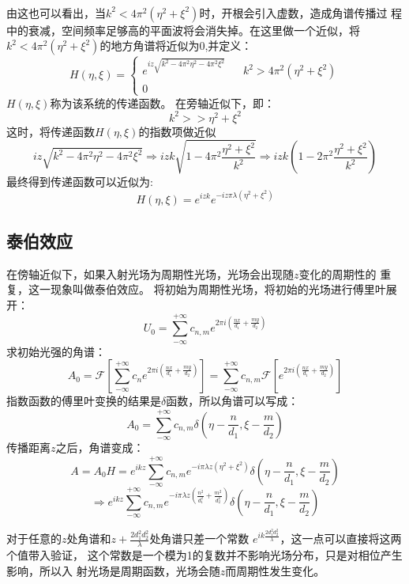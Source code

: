\documentclass{article}
\begin{document}
\paragraph{}
由这也可以看出，当$k^2<4\pi^{2}(\eta^2+\xi^2)$时，开根会引入虚数，造成角谱传播过
程中的衰减，空间频率足够高的平面波将会消失掉。在这里做一个近似，将
$k^2<4\pi^2(\eta^2+\xi^2)$的地方角谱将近似为0,并定义：
\begin{equation}
  \label{eq:4}
  H(\eta,\xi)=\left \{
    \begin{array}{rcl}
      e^{iz \sqrt{k^2-4\pi^2\eta^2-4\pi^2\xi^2}}&&{k^2>4\pi^2(\eta^2+\xi^2)}\\
      0&&{}
    \end{array}
  \right
  .
\end{equation}
$H(\eta,\xi)$称为该系统的传递函数。
在旁轴近似下，即：
\[k^2>>\eta^2+\xi^2\]这时，将传递函数$H(\eta,\xi)$的指数项做近似
\[iz \sqrt{k^2-4\pi^2\eta^2-4\pi^2\xi^2}\Rightarrow izk
  \sqrt{1-4\pi^2\frac{\eta^2+\xi^2}{k^{2}}}\Rightarrow
  izk(1-2\pi^2\frac{\eta^2+\xi^2}{k^{2}})\]
最终得到传递函数可以近似为:
\begin{equation}
  \label{eq:5}
  H(\eta,\xi)=e^{izk}e^{-iz\pi\lambda(\eta^2+\xi^2)}
\end{equation}
\subsection{泰伯效应}
在傍轴近似下，如果入射光场为周期性光场，光场会出现随$z$变化的周期性的
重复，这一现象叫做泰伯效应。
将初始为周期性光场，将初始的光场进行傅里叶展开：
\[U_0=\sum_{-\infty}^{+\infty}c_{n,m}e^{2\pi i(\frac{nx}{d_1}+\frac{my}{d_2})} \]
求初始光强的角谱：
\[A_0=\mathscr{F}[\sum_{-\infty}^{+\infty}c_ne^{2\pi
    i(\frac{nx}{d_1}+\frac{my}{d_2})}]=\sum_{-\infty}^{+\infty}c_{n,m}\mathscr{F}[e^{2\pi
    i(\frac{nx}{d_1}+\frac{my}{d_2})}]\]
指数函数的傅里叶变换的结果是$\delta$函数，所以角谱可以写成：
\[A_0=\sum_{-\infty}^{+\infty}c_{n,m}\delta(\eta-\frac{n}{d_1},\xi-\frac{m}{d_2})\]
传播距离$z$之后，角谱变成：
\[A=A_0H=e^{ikz}\sum_{-\infty}^{+\infty}c_{n,m}e^{-i\pi\lambda
    z(\eta^2+\xi^2)}\delta(\eta-\frac{n}{d_1},\xi-\frac{m}{d_2})\]
\[\Rightarrow e^{ikz}\sum_{-\infty}^{+\infty}c_{n,m}e^{-i\pi\lambda
    z(\frac{n^2}{d_1^2}+\frac{m^2}{d_2^2})}\delta(\eta-\frac{n}{d_1},\xi-\frac{m}{d_2})\]

对于任意的$z$处角谱和$z+\frac{2d_1^2d_2^2}{\lambda}$处角谱只差一个常数
$e^{ik \frac{2d_1^2d_2^2}{\lambda}}$，这一点可以直接将这两个值带入验证，
这个常数是一个模为1的复数并不影响光场分布，只是对相位产生影响，所以入
射光场是周期函数，光场会随$z$而周期性发生变化。
\end{document}
